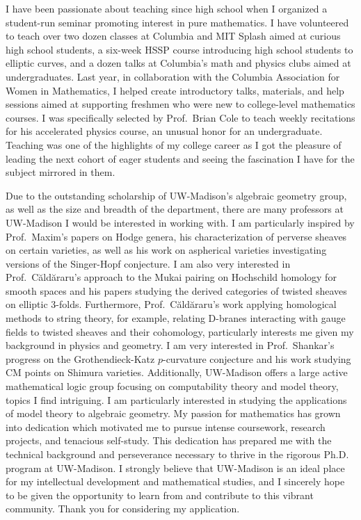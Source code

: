 \documentclass[11pt]{article}
\begin{document}
I have been passionate about teaching since high school when I organized a student-run seminar promoting interest in pure mathematics. I have volunteered to teach over two dozen classes at Columbia and MIT Splash aimed at curious high school students, a six-week HSSP course introducing high school students to elliptic curves, and a dozen talks at Columbia's math and physics clubs aimed at undergraduates. Last year, in collaboration with the Columbia Association for Women in Mathematics, I helped create introductory talks, materials, and help sessions aimed at supporting freshmen who were new to college-level mathematics courses. I was specifically selected by Prof.\ Brian Cole to teach weekly recitations for his accelerated physics course, an unusual honor for an undergraduate. Teaching was one of the highlights of my college career as I got the pleasure of leading the next cohort of eager students and seeing the fascination I have for the subject mirrored in them.
\par
Due to the outstanding scholarship of UW-Madison's algebraic geometry group, as well as the size and breadth of the department, there are many professors at UW-Madison I would be interested in working with. I am particularly inspired by Prof.\ Maxim’s papers on Hodge genera, his characterization of perverse sheaves on certain varieties, as well as his work on aspherical varieties investigating versions of the Singer-Hopf conjecture. I am also very interested in Prof.\ Căldăraru’s approach to the Mukai pairing on Hochschild homology for smooth spaces and his papers studying the derived categories of twisted sheaves on elliptic 3-folds. Furthermore, Prof.\ Căldăraru’s work applying homological methods to string theory, for example, relating D-branes interacting with gauge fields to twisted sheaves and their cohomology, particularly interests me given my background in physics and geometry. I am very interested in Prof.\ Shankar’s progress on the Grothendieck-Katz $p$-curvature conjecture and his work studying CM points on Shimura varieties. Additionally, UW-Madison offers a large active mathematical logic group focusing on computability theory and model theory, topics I find intriguing. I am particularly interested in studying the applications of model theory to algebraic geometry. My passion for mathematics has grown into dedication which motivated me to pursue intense coursework, research projects, and tenacious self-study. This dedication has prepared me with the technical background and perseverance necessary to thrive in the rigorous Ph.D. program at UW-Madison. I strongly believe that UW-Madison is an ideal place for my intellectual development and mathematical studies, and I sincerely hope to be given the opportunity to learn from and contribute to this vibrant community. Thank you for considering my application. 
\end{document}
